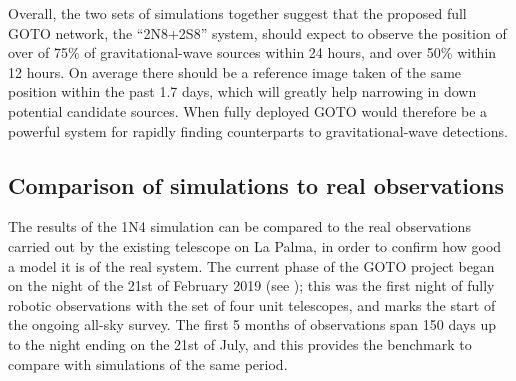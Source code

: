 \begin{colsection}
\begin{colsection}
Overall, the two sets of simulations together suggest that the proposed full GOTO network, the ``2N8+2S8'' system, should expect to observe the position of over of 75\% of gravitational-wave sources within 24 hours, and over 50\% within 12 hours. On average there should be a reference image taken of the same position within the past 1.7 days, which will greatly help narrowing in down potential candidate sources. When fully deployed GOTO would therefore be a powerful system for rapidly finding counterparts to gravitational-wave detections.

\end{colsection}

\newpage
\subsection{Comparison of simulations to real observations}
\label{sec:survey_sim_150}
\begin{colsection}

The results of the 1N4 simulation can be compared to the real observations carried out by the existing telescope on La Palma, in order to confirm how good a model it is of the real system. The current phase of the GOTO project began on the night of the 21st of February 2019 (see ); this was the first night of fully robotic observations with the set of four unit telescopes, and marks the start of the ongoing all-sky survey. The first 5 months of observations span 150 days up to the night ending on the 21st of July, and this provides the benchmark to compare with simulations of the same period.


\end{colsection}
\end{colsection}
